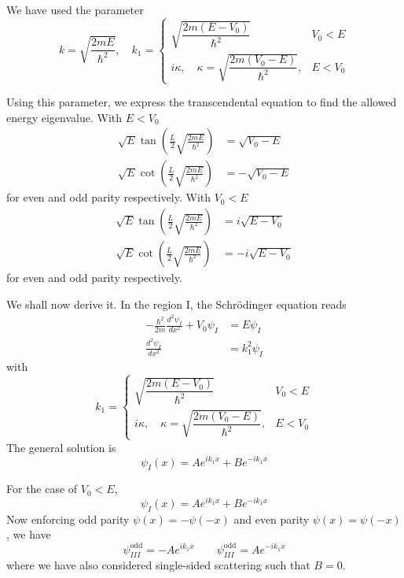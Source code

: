 \documentclass[../../../main.tex]{subfiles}
\begin{document}
We have used the parameter
\begin{equation*}
  k = \sqrt{\frac{2 m E}{\hbar^2}}, \quad
  k_1 =
  \begin{cases}
    \sqrt{\dfrac{2 m (E - V_0)}{\hbar^2}}                           & V_0<E   \\
    i \kappa, \quad \kappa = \sqrt{\dfrac{2 m (V_0 - E)}{\hbar^2}}, & E < V_0
  \end{cases}
\end{equation*}

Using this parameter, we express the transcendental equation to find the allowed energy eigenvalue.
With $E<V_0$
\begin{align*}
  \sqrt{E} \tan \left( \frac{L }{2 }\sqrt{\frac{2mE}{\hbar^2}} \right) & = \sqrt{V_0-E}  \\
  \sqrt{E} \cot \left( \frac{L }{2 }\sqrt{\frac{2mE}{\hbar^2}} \right) & = -\sqrt{V_0-E}
\end{align*}
for even and odd parity respectively.
With $V_0<E$
\begin{align*}
  \sqrt{E} \tan \left( \frac{L }{2 }\sqrt{\frac{2mE}{\hbar^2}} \right) & = i\sqrt{E-V_0}  \\
  \sqrt{E} \cot \left( \frac{L }{2 }\sqrt{\frac{2mE}{\hbar^2}} \right) & = -i\sqrt{E-V_0}
\end{align*}
for even and odd parity respectively.

We shall now derive it.
In the region I, the Schrödinger equation reads
\begin{align*}
  -\frac{\hbar^2}{2 m} \frac{d^2 \psi_{I}}{dx^2} + V_0 \psi_{I} & =  E \psi_{I}   \\
  \frac{d^2 \psi_{I}}{dx^2}                                     & = k_1^2\psi_{I}
\end{align*}
with
\begin{equation*}
  k_1 =
  \begin{cases}
    \sqrt{\dfrac{2 m (E - V_0)}{\hbar^2}}                           & V_0<E   \\
    i \kappa, \quad \kappa = \sqrt{\dfrac{2 m (V_0 - E)}{\hbar^2}}, & E < V_0
  \end{cases}
\end{equation*}
The general solution is
\begin{equation*}
  \psi_{I}(x) = A e^{ik_1x} + B e^{-ik_1 x}
\end{equation*}

For the case of $V_0<E$,
\begin{equation*}
  \psi_{I}(x) = A e^{i k_1 x} + B e^{-i k_1 x}
\end{equation*}
Now enforcing odd parity $\psi(x)=-\psi(-x)$ and even  parity $\psi(x)=\psi(-x)$, we have
\begin{equation*}
  \psi_{III}^{\text{odd}}=-A e^{i k_1 x}
  \qquad
  \psi_{III}^{\text{odd}}=A e^{-i k_1 x}
\end{equation*}
where we have also considered single-sided scattering such that $B=0$.
\end{document}
